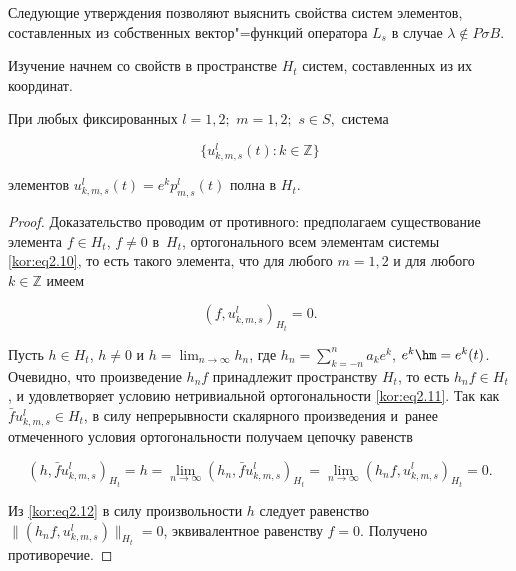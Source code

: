 \smallskip



Следующие утверждения позволяют выяснить свойства систем элементов, составленных из собственных вектор"=функций оператора $L_s$ в случае $\lambda\notin P\sigma B$. 

Изучение начнем со свойств в пространстве $H_t$ систем, составленных из их координат.



\smallskip



\hypertarget{korn:lemma:6}{}



\begin{lemma}[6]При любых фиксированных $l=1,2;$ $m=1,2;$ $s\in S,$ система

\begin{equation}

\label{kor:eq2.10}

\{u_{k,m,s}^l(t):k\in\mathbb{Z}\}

\end{equation}

элементов $u_{k,m,s}^l(t)=e^kp_{m,s}^l(t)$ полна в $H_t.$

\end{lemma}



\smallskip



\begin{proof} Доказательство проводим от противного: предполагаем существование элемента $f\in H_t$, $f\ne0$ в~$H_t$, ортогонального всем элементам системы \eqref{kor:eq2.10}, то есть такого элемента, что для любого $m=1, 2$ и для любого $k\in\mathbb{Z}$ имеем

\begin{equation}

\label{kor:eq2.11}

(f,u_{k,m,s}^l)_{H_t}=0.

\end{equation}



Пусть $h\in H_t$, $h\ne0$ и $h=\lim _{n\to\infty}h_n$, где $h_n=\sum _{k=-n}^n{a_ke^k}$, $e^k\hm =e^k(t)$. Очевидно, что произведение $h_nf$ принадлежит пространству $H_t$, то есть $h_nf\in H_t$, и удовлетворяет условию нетривиальной ортогональности \eqref{kor:eq2.11}. Так как $\bar fu_{k,m,s}^l\in H_t$, в силу непрерывности скалярного произведения и~ранее отмеченного условия ортогональности получаем цепочку равенств

\begin{equation}

\label{kor:eq2.12}

(h,\bar fu_{k,m,s}^l)_{H_t}=h=\lim_{n\to\infty}(h_n,\bar fu_{k,m,s}^l)_{H_t}=\lim_{n\to\infty}(h_nf,u_{k,m,s}^l)_{H_t}=0.

\end{equation}

Из \eqref{kor:eq2.12} в силу произвольности $h$ следует равенство $\|(h_nf,u_{k,m,s}^l)\|_{H_t}=0$, эквивалентное равенству $f = 0$. Получено противоречие. \end{proof}



